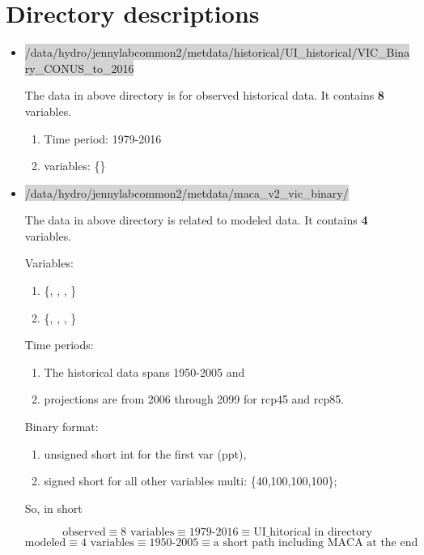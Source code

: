 \section{Directory descriptions}

\begin{itemize}
\item {\scriptsize{\colorbox{lightgray}{/data/hydro/jennylabcommon2/metdata/historical/UI\_historical/VIC\_Binary\_CONUS\_to\_2016}}}

The data in above directory is for observed historical data. It contains \textbf{8} variables.

\begin{enumerate}
\item Time period: 1979-2016
\item variables: \{\}
\end{enumerate}

\item {\scriptsize{\colorbox{lightgray}{/data/hydro/jennylabcommon2/metdata/maca\_v2\_vic\_binary/}}}

The data in above directory is related to modeled data. It contains \textbf{4} variables.

Variables: 
\begin{enumerate}
\item \{, , , \} 
\item \{, , , \}
\end{enumerate}

Time periods:
\begin{enumerate}
\item The historical data spans 1950-2005 and 
\item projections are from 2006 through 2099 for rcp45 and rcp85.
\end{enumerate}
   
Binary format:
\begin{enumerate}
\item unsigned short int for the first var (ppt),
\item signed short for all other variables multi: \{40,100,100,100\};
\end{enumerate}

So, in short 

\[ \text{observed} \equiv  \text{8 variables} \equiv \text{1979-2016} \equiv \text{UI\_hitorical in directory }\]
\vspace{-.2in}
\[ \text{modeled} \equiv  \text{4 variables} \equiv \text{1950-2005} \equiv \text{a short path including MACA at the end}\]
\end{itemize}

